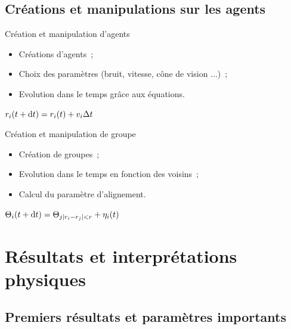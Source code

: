 \documentclass[aspectratio=43, a4paper, 12pt]{beamer}
\begin{document}
\subsection{Créations et manipulations sur les agents}
\begin{frame}{Création et manipulation d'agents}
\begin{itemize}
\item Créations d'agents~;
\item Choix des paramètres (bruit, vitesse, cône de vision $\dots$)~;
\item Evolution dans le temps grâce aux équations.
\end{itemize}
\vspace{1cm}
\begin{center}$r_{i}(t + \text dt)  =  r_{i}(t) + v_{i}\Delta t$\end{center}
\end{frame}

\begin{frame}{Création et manipulation de groupe}
\begin{itemize}
\item Création de groupes~;
\item Evolution dans le temps en fonction des voisins~;
\item Calcul du paramètre d'alignement.
\end{itemize}
\vspace{1cm}
\begin{center}$\Theta_{i}(t + \text dt)  =  \Theta_{j |r_{i}-r_{j}|<r} + \eta_{i}(t)$\end{center}
\end{frame}

\section{Résultats et interprétations physiques}
\subsection{Premiers résultats et paramètres importants}
\end{document}
